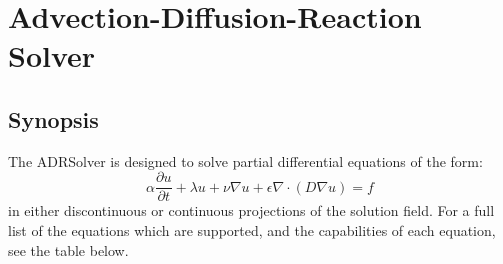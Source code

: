 \section{Advection-Diffusion-Reaction Solver}


\subsection{Synopsis}

The ADRSolver is designed to solve partial differential equations of the form:
\begin{equation}
\alpha \dfrac{\partial u}{\partial t} + \lambda u + \nu \nabla u + \epsilon \nabla \cdot (D \nabla u) = f
\end{equation}
in either discontinuous or continuous projections of the solution field. 
For a full list of the equations which are supported, and the capabilities of each equation, 
see the table below.

